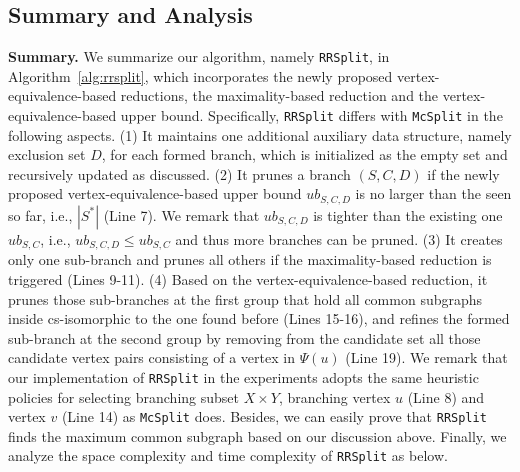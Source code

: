 \subsection{Summary and Analysis}
\label{subsec:summary}
\noindent\textbf{Summary.}
We summarize our algorithm, namely \texttt{RRSplit}, in Algorithm~\ref{alg:rrsplit}, which incorporates the newly proposed vertex-equivalence-based reductions, the maximality-based reduction and the vertex-equivalence-based upper bound. Specifically, \texttt{RRSplit} differs with \texttt{McSplit} in the following aspects. (1) It maintains one additional auxiliary data structure, namely exclusion set $D$, for each formed {\chengB branch}, which is initialized as 
the empty set and recursively updated as discussed. (2)  It {\chengB prunes} a branch $(S,C,D)$ if the newly proposed vertex-equivalence-based upper bound $ub_{S,C,D}$ is no larger than the    seen so far, i.e., $|S^*|$ (Line 7). We remark that $ub_{S,C,D}$ is tighter than the existing one $ub_{S,C}$, i.e., $ub_{S,C,D}\leq ub_{S,C}$ and thus more branches can be pruned. (3) It creates only one sub-branch and prunes all others if the maximality-based reduction is triggered (Lines 9-11). (4) Based on the vertex-equivalence-based reduction, it prunes those sub-branches at the first group that hold all common subgraphs inside cs-isomorphic to the one found before (Lines 15-16), and refines the formed sub-branch at the second group by removing from the candidate set all those candidate vertex pairs consisting of a vertex in $\Psi(u)$ (Line 19).
%
We remark that our implementation of \texttt{RRSplit} in the experiments adopts the same heuristic policies for selecting branching subset $X\times Y$, branching vertex $u$ (Line 8) and vertex $v$ (Line 14) as \texttt{McSplit} {\chengB does}.
%
Besides, we can easily prove that \texttt{RRSplit} finds the maximum common subgraph based on our discussion above. Finally, we analyze the {space complexity and time complexity} of \texttt{RRSplit} as below. 


